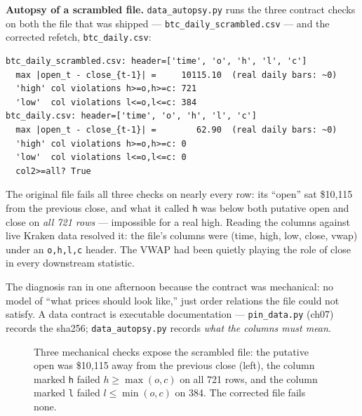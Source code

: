 \begin{example}\label{ex:autopsy}
\textbf{Autopsy of a scrambled file.}
\texttt{data\_autopsy.py} runs the three contract checks on
both the file that was shipped --- \texttt{btc\_daily\_scrambled.csv}
--- and the corrected refetch, \texttt{btc\_daily.csv}:
\begin{verbatim}
btc_daily_scrambled.csv: header=['time', 'o', 'h', 'l', 'c']
  max |open_t - close_{t-1}| =     10115.10  (real daily bars: ~0)
  'high' col violations h>=o,h>=c: 721
  'low'  col violations l<=o,l<=c: 384
btc_daily.csv: header=['time', 'o', 'h', 'l', 'c']
  max |open_t - close_{t-1}| =        62.90  (real daily bars: ~0)
  'high' col violations h>=o,h>=c: 0
  'low'  col violations l<=o,l<=c: 0
  col2>=all? True
\end{verbatim}
The original file fails all three checks on nearly every row:
its ``open'' sat \$10{,}115 from the previous close, and what it
called \texttt{h} was below both putative open and close on
\emph{all 721 rows} --- impossible for a real high. Reading the
columns against live Kraken data resolved it: the file's columns
were (time, high, low, close, vwap) under an
\texttt{o,h,l,c} header. The VWAP had been quietly playing the
role of close in every downstream statistic.
\begin{solution}
The diagnosis ran in one afternoon because the contract was
mechanical: no model of ``what prices should look like,'' just
order relations the file could not satisfy. A data contract is
executable documentation --- \texttt{pin\_data.py} (ch07) records
the sha256; \texttt{data\_autopsy.py} records \emph{what the
columns must mean}.
\end{solution}
\end{example}

\begin{figure}[htbp]\centering

\caption{Three mechanical checks expose the scrambled file: the
putative open was \$10{,}115 away from the previous close
(left), the column marked \texttt{h} failed $h\ge\max(o,c)$ on
all 721 rows, and the column marked \texttt{l} failed
$l\le\min(o,c)$ on 384. The corrected file fails none.}
\label{fig:autopsy}
\end{figure}

